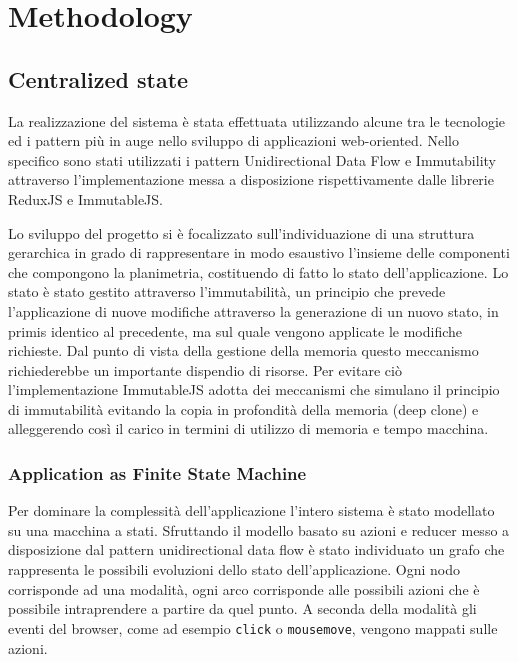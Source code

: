 \section{Methodology}

\subsection{Centralized state}
La realizzazione del sistema \`e stata effettuata utilizzando alcune tra le tecnologie ed i pattern pi\`u in auge nello sviluppo di applicazioni web-oriented. Nello specifico sono stati utilizzati i pattern Unidirectional Data Flow e Immutability attraverso l'implementazione messa a disposizione rispettivamente dalle librerie ReduxJS e ImmutableJS.


Lo sviluppo del progetto si \`e focalizzato sull'individuazione di una struttura gerarchica in grado di rappresentare in modo esaustivo l'insieme delle componenti che compongono la planimetria, costituendo di fatto lo stato dell'applicazione. Lo stato \`e stato gestito attraverso l'immutabilit\`a, un principio che prevede l'applicazione di nuove modifiche attraverso la generazione di un nuovo stato, in primis identico al precedente, ma sul quale vengono applicate le modifiche richieste. Dal punto di vista della gestione della memoria questo meccanismo richiederebbe un importante dispendio di risorse. Per evitare ci\`o l'implementazione ImmutableJS adotta dei meccanismi che simulano il principio di immutabilit\`a evitando la copia in profondit\`a della memoria  (deep clone) e alleggerendo cos\`i il carico in termini di utilizzo di memoria e tempo macchina.


\subsubsection{Application as Finite State Machine}
Per dominare la complessit\`a dell'applicazione l'intero sistema \`e stato modellato su una macchina a stati. Sfruttando il modello basato su azioni e reducer messo a disposizione dal pattern unidirectional data flow \`e stato individuato un grafo che rappresenta le possibili evoluzioni dello stato dell'applicazione. Ogni nodo corrisponde ad una modalit\`a, ogni arco corrisponde alle possibili azioni che è possibile intraprendere a partire da quel punto. A seconda della modalit\`a gli eventi del browser, come ad esempio \texttt{click} o \texttt{mousemove}, vengono mappati sulle azioni.

